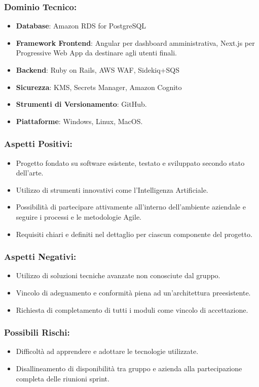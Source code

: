 \documentclass[a4paper,12pt]{article}
\begin{document}
\subsubsection*{Dominio Tecnico:}
\begin{itemize}
    \item \textbf{Database}: Amazon RDS for PostgreSQL
    \item \textbf{Framework Frontend}: Angular per dashboard amministrativa, Next.js per Progressive Web App da destinare agli utenti finali.
    \item \textbf{Backend}: Ruby on Rails, AWS WAF, Sidekiq+SQS
    \item \textbf{Sicurezza}: KMS, Secrets Manager, Amazon Cognito
    \item \textbf{Strumenti di Versionamento}: GitHub.
    \item \textbf{Piattaforme}: Windows, Linux, MacOS.
\end{itemize}
\subsubsection*{Aspetti Positivi:}
\begin{itemize}
    \item Progetto fondato su software esistente, testato e sviluppato secondo stato dell'arte.
    \item Utilizzo di strumenti innovativi come l'Intelligenza Artificiale.
    \item Possibilità di partecipare attivamente all'interno dell'ambiente aziendale e seguire i processi e le metodologie Agile.
    \item Requisiti chiari e definiti nel dettaglio per ciascun componente del progetto.
\end{itemize}

\subsubsection*{Aspetti Negativi:}
\begin{itemize}
    \item Utilizzo di soluzioni tecniche avanzate non conosciute dal gruppo.
    \item Vincolo di adeguamento e conformità piena ad un'architettura preesistente.
    \item Richiesta di completamento di tutti i moduli come vincolo di accettazione.
\end{itemize}

\subsubsection*{Possibili Rischi:}
\begin{itemize}
    \item Difficoltà ad apprendere e adottare le tecnologie utilizzate.
    \item Disallineamento di disponibilità tra gruppo e azienda alla partecipazione completa delle riunioni sprint.
\end{itemize}
\end{document}
